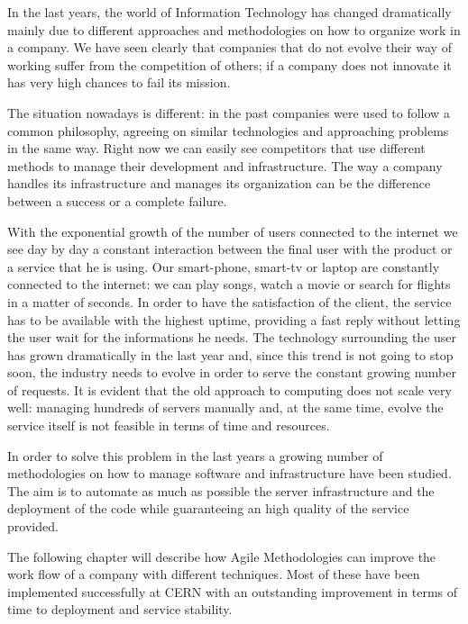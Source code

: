 

In the last years, the world of Information Technology has changed
dramatically mainly due to different approaches and methodologies on how
to organize work in a company. We have seen clearly that companies that do
not evolve their way of working suffer from the competition of others; if
a company does not innovate it has very high chances to fail its mission.

The situation nowadays is different: in the past companies were used to
follow a common philosophy, agreeing on similar technologies and
approaching problems in the same way. Right now we can easily see
competitors that use different methods to manage their development and
infrastructure. The way a company handles its infrastructure and manages
its organization can be the difference between a success or a complete
failure.

With the exponential growth of the number of users connected to the
internet we see day by day a constant interaction between the final user
with the product or a service that he is using. Our smart-phone, smart-tv
or laptop are constantly connected to the internet: we can play songs,
watch a movie or search for flights in a matter of seconds. In order to
have the satisfaction of the client, the service has to be available with
the highest uptime, providing a fast reply without letting the user wait
for the informations he needs. The technology surrounding the user has
grown dramatically in the last year and, since this trend is not going to
stop soon, the industry needs to evolve in order to serve the constant
growing number of requests. It is evident that the old approach to
computing does not scale very well: managing hundreds of servers manually
and, at the same time, evolve the service itself is not feasible in terms
of time and resources.

In order to solve this problem in the last years a growing number of
methodologies on how to manage software and infrastructure have been
studied. The aim is to automate as much as possible the server
infrastructure and the deployment of the code while guaranteeing an high
quality of the service provided.

The following chapter will describe how Agile Methodologies can improve
the work flow of a company with different techniques. Most of these have
been implemented successfully at CERN with an outstanding improvement in
terms of time to deployment and service stability.

